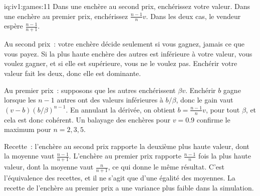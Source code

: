 \begin{solution}{iq:iv1:games:11}
Dans une enchère au second prix, enchérissez votre valeur. Dans une enchère au premier prix, enchérissez $\frac{n - 1}{n}v$. Dans les deux cas, le vendeur espère $\frac{n - 1}{n + 1}$.

Au second prix~: votre enchère décide seulement si vous gagnez, jamais ce que vous payez. Si la plus haute enchère des autres est inférieure à votre valeur, vous voulez gagner, et si elle est supérieure, vous ne le voulez pas. Enchérir votre valeur fait les deux, donc elle est dominante.

Au premier prix~: supposons que les autres enchérissent $\beta v$. Enchérir $b$ gagne lorsque les $n - 1$ autres ont des valeurs inférieures à $b/\beta$, donc le gain vaut $(v - b)(b/\beta)^{n - 1}$. En annulant la dérivée, on obtient $b = \frac{n - 1}{n}v$, pour tout $\beta$, et cela est donc cohérent. Un balayage des enchères pour $v = 0.9$ confirme le maximum pour $n = 2, 3, 5$.

Recette~: l'enchère au second prix rapporte la deuxième plus haute valeur, dont la moyenne vaut $\frac{n - 1}{n + 1}$. L'enchère au premier prix rapporte $\frac{n - 1}{n}$ fois la plus haute valeur, dont la moyenne vaut $\frac{n}{n + 1}$, ce qui donne le même résultat. C'est l'équivalence des recettes, et il ne s'agit que d'une égalité des moyennes. La recette de l'enchère au premier prix a une variance plus faible dans la simulation.

\end{solution}

